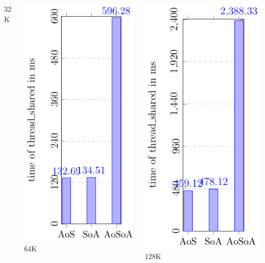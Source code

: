 \documentclass[aspectratio=169]{beamer}
\begin{document}
\begin{frame}
\begin{columns}
\begin{column}{0.25\textwidth}
	\small 32K
	\end{column}
	\begin{column}{0.25\textwidth}
	\includegraphics[scale=0.55]{figures/fig3.pdf}
	\small 64K
	\end{column}
	\begin{column}{0.25\textwidth}
	\includegraphics[scale=0.55]{figures/fig4.pdf}
	\small 128K
	\end{column}	
	\end{columns}
	

\end{frame}
\end{document}
